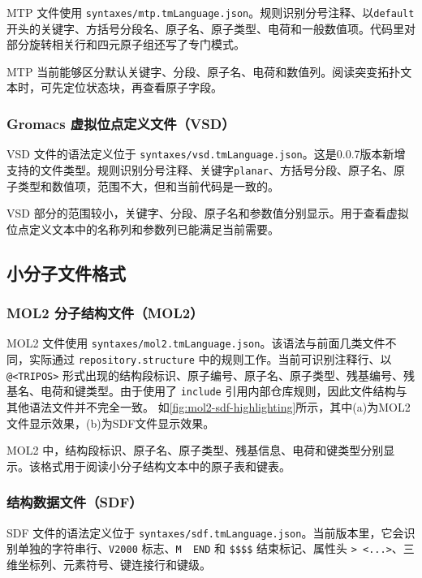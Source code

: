 MTP 文件使用 \lstinline|syntaxes/mtp.tmLanguage.json|。规则识别分号注释、以\lstinline|default|开头的关键字、方括号分段名、原子名、原子类型、电荷和一般数值项。代码里对部分旋转相关行和四元原子组还写了专门模式。

MTP 当前能够区分默认关键字、分段、原子名、电荷和数值列。阅读突变拓扑文本时，可先定位状态块，再查看原子字段。

\subsubsection{Gromacs 虚拟位点定义文件（VSD）}

VSD 文件的语法定义位于 \lstinline|syntaxes/vsd.tmLanguage.json|。这是0.0.7版本新增支持的文件类型。规则识别分号注释、关键字\lstinline|planar|、方括号分段、原子名、原子类型和数值项，范围不大，但和当前代码是一致的。

VSD 部分的范围较小，关键字、分段、原子名和参数值分别显示。用于查看虚拟位点定义文本中的名称列和参数列已能满足当前需要。

\subsection{小分子文件格式}

\subsubsection{MOL2 分子结构文件（MOL2）}

MOL2 文件使用 \lstinline|syntaxes/mol2.tmLanguage.json|。该语法与前面几类文件不同，实际通过 \lstinline|repository.structure| 中的规则工作。当前可识别注释行、以 \lstinline|@<TRIPOS>| 形式出现的结构段标识、原子编号、原子名、原子类型、残基编号、残基名、电荷和键类型。由于使用了 \lstinline|include| 引用内部仓库规则，因此文件结构与其他语法文件并不完全一致。
如\ref{fig:mol2-sdf-highlighting}所示，其中(a)为MOL2文件显示效果，(b)为SDF文件显示效果。

MOL2 中，结构段标识、原子名、原子类型、残基信息、电荷和键类型分别显示。该格式用于阅读小分子结构文本中的原子表和键表。

\subsubsection{结构数据文件（SDF）}

SDF 文件的语法定义位于 \lstinline|syntaxes/sdf.tmLanguage.json|。当前版本里，它会识别单独的字符串行、\lstinline|V2000| 标志、\lstinline|M  END| 和 \lstinline|$$$$| 结束标记、属性头 \lstinline|> <...>|、三维坐标列、元素符号、键连接行和键级。

